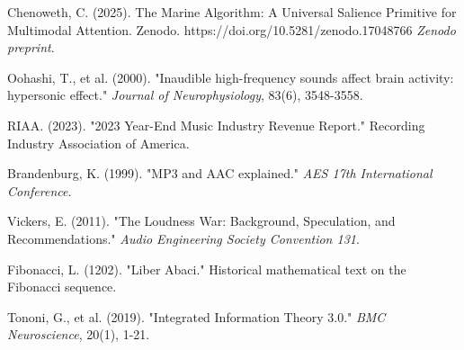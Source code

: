 \documentclass[12pt,a4paper]{article}
\begin{document}
\begin{thebibliography}{99}

Chenoweth, C. (2025). The Marine Algorithm: A Universal Salience Primitive for Multimodal Attention. Zenodo. https://doi.org/10.5281/zenodo.17048766 \textit{Zenodo preprint}.

Oohashi, T., et al. (2000). "Inaudible high-frequency sounds affect brain activity: hypersonic effect." \textit{Journal of Neurophysiology}, 83(6), 3548-3558.

RIAA. (2023). "2023 Year-End Music Industry Revenue Report." Recording Industry Association of America.

Brandenburg, K. (1999). "MP3 and AAC explained." \textit{AES 17th International Conference}.

Vickers, E. (2011). "The Loudness War: Background, Speculation, and Recommendations." \textit{Audio Engineering Society Convention 131}.

Fibonacci, L. (1202). "Liber Abaci." Historical mathematical text on the Fibonacci sequence.

Tononi, G., et al. (2019). "Integrated Information Theory 3.0." \textit{BMC Neuroscience}, 20(1), 1-21.

\end{thebibliography}
\end{document}
